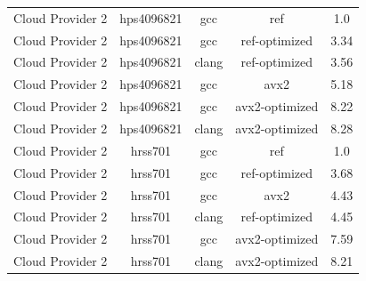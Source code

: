 \begin{table}
\begin{tabularx}{\linewidth}{X c c c c}
            Cloud Provider 2 &           hps4096821 &                  gcc &                  ref &                  1.0\\
            Cloud Provider 2 &           hps4096821 &                  gcc &        ref-optimized &                3.34\\
            Cloud Provider 2 &           hps4096821 &                clang &        ref-optimized &                3.56\\
            Cloud Provider 2 &           hps4096821 &                  gcc &                 avx2 &                5.18\\
            Cloud Provider 2 &           hps4096821 &                  gcc &       avx2-optimized &                8.22\\
            Cloud Provider 2 &           hps4096821 &                clang &       avx2-optimized &                8.28\\
            Cloud Provider 2 &              hrss701 &                  gcc &                  ref &                  1.0\\
            Cloud Provider 2 &              hrss701 &                  gcc &        ref-optimized &                3.68\\
            Cloud Provider 2 &              hrss701 &                  gcc &                 avx2 &                4.43\\
            Cloud Provider 2 &              hrss701 &                clang &        ref-optimized &                4.45\\
            Cloud Provider 2 &              hrss701 &                  gcc &       avx2-optimized &                7.59\\
            Cloud Provider 2 &              hrss701 &                clang &       avx2-optimized &                8.21\\
        \bottomrule
    \end{tabularx}
\end{table}

